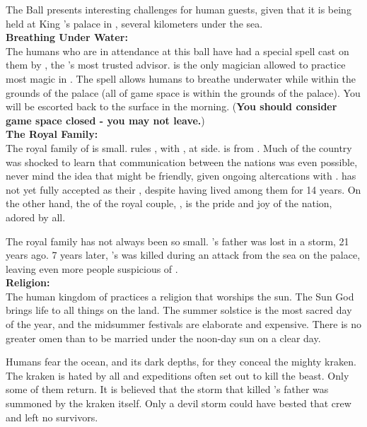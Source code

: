 \documentclass[blue]{NeptuneBall}
\begin{document}
\name{\bHuman{}}

The \cExExKing{} Ball presents interesting challenges for human guests, given that it is being held at King \cKing{\MYname{}}'s palace in \pAtlantis{}, several kilometers under the sea.\\

{\bf Breathing Under Water:}\\
The humans who are in attendance at this ball have had a special spell cast on them by \cManta{}, the \cKing{\King}'s most trusted advisor. \cManta{} is the only magician allowed to practice most magic in \pAtlantis{}. The spell allows humans to breathe underwater while within the grounds of the palace (all of game space is within the grounds of the palace). You will be escorted back to the surface in the morning. ({\bf You should consider game space closed - you may not leave.})\\

{\bf The Royal Family:}\\
The royal family of \pAmerica{} is small. \cEric{\King} \cEric{} rules \pAmerica{}, with \cEric{\their} \cAriel{\spouse}, \cAriel{\King} \cAriel{} at \cEric{\their} side. \cAriel{} is from \pAtlantis{}. Much of the country was shocked to learn that communication between the nations was even possible, never mind the idea that \pAtlantis{} might be friendly, given ongoing altercations with \pPacifica{}. \pAmerica{} has not yet fully accepted \cAriel{} as their \cAriel{\King}, despite \cAriel{\their} having lived among them for 14 years. On the other hand, the \cWillow{\offspring} of the royal couple, \cWillow{\Prince} \cWillow{}, is the pride and joy of the nation, adored by all.

The royal family has not always been so small. \cEric{}'s father was lost in a storm, 21 years ago. 7 years later, \cEric{}'s \cSlave{\sibling} was killed during an attack from the sea on the palace, leaving even more people suspicious of \cAriel{\King} \cAriel{}.\\

{\bf Religion:}\\
The human kingdom of \pAmerica{} practices a religion that worships the sun. The Sun God brings life to all things on the land. The summer solstice is the most sacred day of the year, and the midsummer festivals are elaborate and expensive. There is no greater omen than to be married under the noon-day sun on a clear day.

Humans fear the ocean, and its dark depths, for they conceal the mighty kraken. The kraken is hated by all and expeditions often set out to kill the beast. Only some of them return. It is believed that the storm that killed \cEric{}'s father was summoned by the kraken itself. Only a devil storm could have bested that crew and left no survivors.\\
\end{document}
